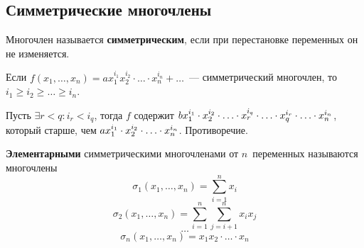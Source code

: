 \subsection{Симметрические многочлены}
 Многочлен называется \textbf{симметрическим}, если при перестановке переменных он не изменяется.

\begin{statement}
Если $f(x_1, \ldots, x_n) = a x_1^{i_1} x_2^{i_2} \cdot \ldots \cdot x_n^{i_n} + \ldots$~--- симметрический многочлен, то $i_1 \geqslant i_2 \geqslant \ldots \geqslant i_n$.
\end{statement}
\begin{proofcontra}
Пусть $\exists r < q \colon i_r < i_q$, тогда $f$ содержит
$b x_1^{i_1} \opbr\cdot x_2^{i_2} \opbr\cdot \ldots \opbr\cdot x_r^{i_q} \opbr\cdot \ldots \opbr\cdot x_q^{i_r} \opbr\cdot \ldots \opbr\cdot x_n^{i_n}$, который старше, чем
$a x_1^{i_1} \opbr\cdot x_2^{i_2} \opbr\cdot \ldots \opbr\cdot x_n^{i_n}$.
Противоречие.
\end{proofcontra}

\textbf{Элементарными} симметрическими многочленами от $n$~переменных называются многочлены
\begin{equation*}
\sigma_1(x_1, \ldots, x_n) = \sum_{i=1}^n x_i
\end{equation*}
\begin{equation*}
\sigma_2(x_1, \ldots, x_n) = \sum_{i=1}^n \sum_{j=i+1}^n x_i x_j
\end{equation*}
\begin{equation*}
\ldots
\end{equation*}
\begin{equation*}
\sigma_n(x_1, \ldots, x_n) = x_1 x_2 \cdot \ldots \cdot x_n 
\end{equation*}

